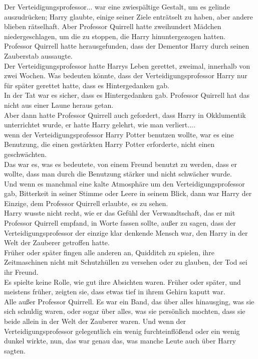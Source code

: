 {Der Verteidigungsprofessor... war eine zwiespältige Gestalt, um es gelinde auszudrücken; Harry glaubte, einige seiner Ziele enträtselt zu haben, aber andere blieben rätselhaft. Aber Professor Quirrell hatte zweihundert Mädchen niedergeschlagen, um die zu stoppen, die Harry hinuntergezogen hatten.\\ Professor Quirrell hatte herausgefunden, dass der Dementor Harry durch seinen Zauberstab aussaugte.\\ Der Verteidigungsprofessor hatte Harrys Leben gerettet, zweimal, innerhalb von zwei Wochen. Was bedeuten könnte, dass der Verteidigungsprofessor Harry nur für später gerettet hatte, dass es Hintergedanken gab.\\ In der Tat war es sicher, dass es Hintergedanken gab. Professor Quirrell hat das nicht aus einer Laune heraus getan.\\ Aber dann hatte Professor Quirrell auch gefordert, dass Harry in Okklumentik unterrichtet wurde, er hatte Harry gelehrt, wie man verliert....\\ wenn der Verteidigungsprofessor Harry Potter benutzen wollte, war es eine Benutzung, die einen gestärkten Harry Potter erforderte, nicht einen geschwächten.\\ Das war es, was es bedeutete, von einem Freund benutzt zu werden, dass er wollte, dass man durch die Benutzung stärker und nicht schwächer wurde.\\ Und wenn es manchmal eine kalte Atmosphäre um den Verteidigungsprofessor gab, Bitterkeit in seiner Stimme oder Leere in seinem Blick, dann war Harry der Einzige, dem Professor Quirrell erlaubte, es zu sehen.\\ Harry wusste nicht recht, wie er das Gefühl der Verwandtschaft, das er mit Professor Quirrell empfand, in Worte fassen sollte, außer zu sagen, dass der Verteidigungsprofessor der einzige klar denkende Mensch war, den Harry in der Welt der Zauberer getroffen hatte.\\ Früher oder später fingen alle anderen an, Quidditch zu spielen, ihre Zeitmaschinen nicht mit Schutzhüllen zu versehen oder zu glauben, der Tod sei ihr Freund.\\ Es spielte keine Rolle, wie gut ihre Absichten waren. Früher oder später, und meistens früher, zeigten sie, dass etwas tief in ihrem Gehirn kaputt war.\\ Alle außer Professor Quirrell. Es war ein Band, das über alles hinausging, was sie sich schuldig waren, oder sogar über alles, was sie persönlich mochten, dass sie beide allein in der Welt der Zauberer waren. Und wenn der Verteidigungsprofessor gelegentlich ein wenig furchteinflößend oder ein wenig dunkel wirkte, nun, das war genau das, was manche Leute auch über Harry sagten.

}
